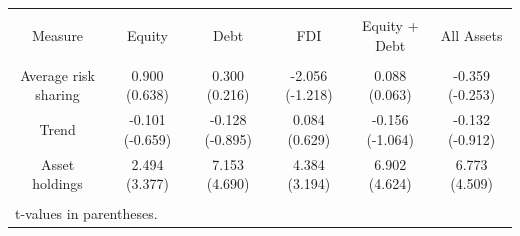 
\begin{tabular}{@{\extracolsep{5pt}} cccccc} 
\\[-1.8ex]\hline 
\hline \\[-1.8ex] 
Measure & Equity & Debt & FDI & Equity + Debt & All Assets \\ 
\hline \\[-1.8ex] 
Average risk sharing & 0.900 (0.638) & 0.300 (0.216) & -2.056 (-1.218) & 0.088 (0.063) & -0.359 (-0.253) \\ 
Trend & -0.101 (-0.659) & -0.128 (-0.895) & 0.084 (0.629) & -0.156 (-1.064) & -0.132 (-0.912) \\ 
Asset holdings & 2.494 (3.377) & 7.153 (4.690) & 4.384 (3.194) & 6.902 (4.624) & 6.773 (4.509) \\ 
\hline \\[-1.8ex] 
\multicolumn{6}{l}{t-values in parentheses.} \\ 
\end{tabular} 
